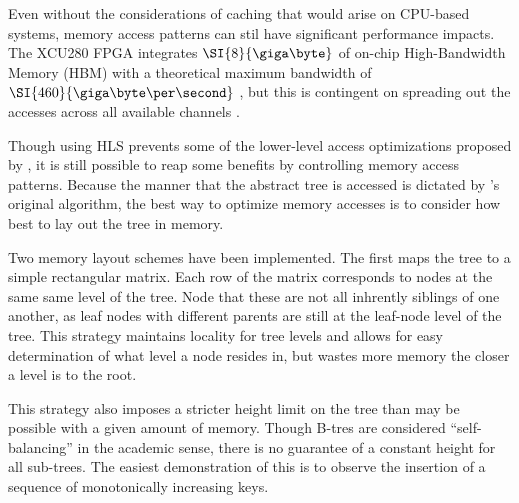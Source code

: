 \begin{figure}[H]
	\centering
	
\end{figure}

\begin{figure}[H]
	\centering
	
\end{figure}



Even without the considerations of caching that would arise on CPU-based
systems, memory access patterns can stil have significant performance impacts.
The XCU280 FPGA integrates $\SI{8}{\giga\byte}$ of on-chip High-Bandwidth Memory
(HBM) with a theoretical maximum bandwidth of $\SI{460}{\giga\byte\per\second}$
\autocite{u280}, but this is contingent on spreading out the accesses across all
available channels \autocite{holzinger-ipdpsw-2021}.

Though using HLS prevents some of the lower-level access optimizations proposed
by \citeauthor{holzinger-ipdpsw-2021}, it is still possible to reap some
benefits by controlling memory access patterns. Because the manner that the
abstract tree is accessed is dictated by \citeauthor{b-link}'s original
algorithm, the best way to optimize memory accesses is to consider how best to
lay out the tree in memory.


\begin{figure}[H]
	\centering
	
\end{figure}

Two memory layout schemes have been implemented. The first maps the tree to a
simple rectangular matrix. Each row of the matrix corresponds to nodes at the
same same level of the tree. Node that these are not all inhrently siblings of
one another, as leaf nodes with different parents are still at the leaf-node
level of the tree. This strategy maintains locality for tree levels and allows
for easy determination of what level a node resides in, but wastes more memory
the closer a level is to the root.

This strategy also imposes a stricter height limit on the tree than may be
possible with a given amount of memory. Though B-tres are considered
``self-balancing'' in the academic sense, there is no guarantee of a constant
height for all sub-trees. The easiest demonstration of this is to observe the
insertion of a sequence of monotonically increasing keys.

